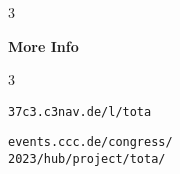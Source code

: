 \documentclass[a4paper]{article}
\newcommand{\FooterColumnCount}{3}
\newcommand{\FooterColumnCount}{2}
\begin{document}
{\begin{multicols}{\FooterColumnCount}
{\columnbreak
}

\textbf{More Info\\}
\vspace{1cm}

\end{multicols}

\begin{multicols}{\FooterColumnCount}

\texttt{37c3.c3nav.de/l/tota}

\columnbreak


\texttt{events.ccc.de/congress/\\2023/hub/project/tota/}


\end{multicols}


\pagebreak
}
\end{document}
